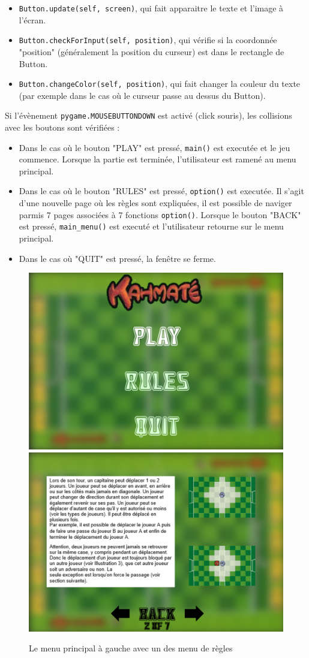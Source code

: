 \documentclass[a4paper,12pt]{article}
\begin{document}
\begin{itemize}
  \item \texttt{Button.update(self, screen)}, qui fait apparaitre le texte et l'image à l'écran.
  \item \texttt{Button.checkForInput(self, position)}, qui vérifie si la coordonnée "position" (généralement la position du curseur) est dans le rectangle de Button.
  \item \texttt{Button.changeColor(self, position)}, qui fait changer la couleur du texte (par exemple dans le cas où le curseur passe au dessus du Button).
\end{itemize} 
Si l'évènement \texttt{pygame.MOUSEBUTTONDOWN} est activé (click souris), les collisions avec les boutons sont vérifiées :
\begin{itemize}
  \item Dans le cas où le bouton "PLAY" est pressé, \texttt{main()} est executée et le jeu commence. Lorsque la partie est terminée, l'utilisateur est ramené au menu principal.
  \item Dans le cas où le bouton "RULES" est pressé, \texttt{option()} est executée. Il s'agit d'une nouvelle page où les règles sont expliquées, il est possible de naviger parmis 7 pages associées à 7 fonctions \texttt{option()}. Lorsque le bouton "BACK" est pressé, \texttt{main\_menu()} est executé et l'utilisateur retourne sur le menu principal.
  \item Dans le cas où "QUIT" est pressé, la fenêtre se ferme.
\end{itemize}

\begin{figure}[h!]
  \centering
  \includegraphics[width=0.45\linewidth]{main_menu_1.png}
  \includegraphics[width=0.45\linewidth]{main_menu_2.png}
  \caption{Le menu principal à gauche avec un des menu de règles}
\end{figure}
\end{document}
